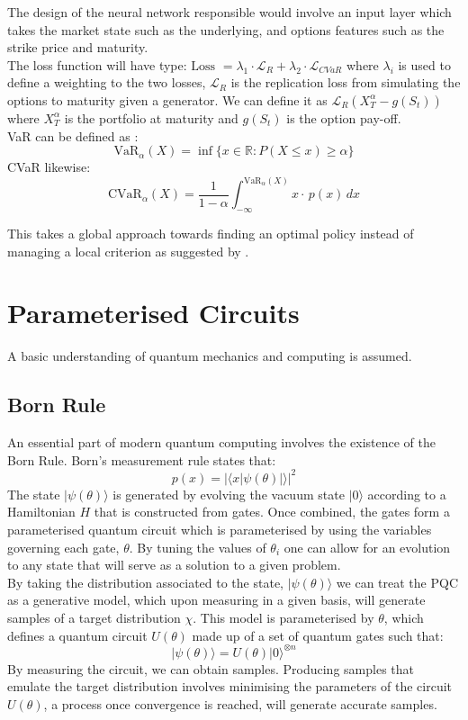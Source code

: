 \documentclass[12pt]{article}
\numberwithin{equation}{section}
\begin{document}
The design of the neural network responsible would involve an input layer which
takes the market state such as the underlying, and options features such as the 
strike price and maturity.\\
The loss function will have
type: $\text{Loss }=\lambda_1\cdot\mathcal{L}_R + \lambda_2 \cdot \mathcal{L}_{CVaR}$
where $\lambda_i$ is used to define a weighting to the two losses, $\mathcal{L}_R$ 
is the replication loss from simulating the options to maturity given a generator. 
We can define it as $\mathcal{L}_R(X^\alpha_T-g(S_t))$ where $X^\alpha_T$ is the 
portfolio at maturity and $g(S_t)$ is the option pay-off.\\
VaR can be defined as :
\begin{equation}
\text{VaR}_{\alpha}(X) = \inf \{x \in \mathbb{R} : P(X \leq x) \geq \alpha \}
\end{equation}
CVaR likewise: 
\begin{equation}
\text{CVaR}_{\alpha}(X) = \frac{1}{1 - \alpha} \int_{-\infty}^{\text{VaR}_{\alpha}(X)} x \cdot\, p(x) \, dx
\end{equation}

This takes a global approach towards finding an optimal policy instead of 
managing a local criterion as suggested by \cite{Fecamp}.


\clearpage 
\section{Parameterised Circuits}
A basic understanding of quantum mechanics and computing is assumed. 
\subsection{Born Rule}
An essential part of modern quantum computing involves the existence of the Born
Rule. Born's measurement rule states that:
\begin{equation}
p(x) = |\langle x|\psi(\theta)|\rangle|^2
\end{equation}
The state $|\psi(\theta)\rangle$ is generated by evolving the vacuum state $|0\rangle$
according to a Hamiltonian $H$ that is constructed from gates. Once combined, the 
gates form a parameterised quantum circuit which is parameterised by using the 
variables governing each gate, $\theta$. By tuning the values of $\theta_i$ one 
can allow for an evolution to any state that will serve as a solution to a given 
problem. \\ 
By taking the distribution associated to the state, $|\psi(\theta)\rangle$ we can 
treat the PQC as a generative model, which upon measuring in a given basis, will 
generate samples of a target distribution $\chi$. This model is parameterised 
by $\theta$, which defines a quantum circuit $U(\theta)$ made up of a set of quantum 
gates such that:
\begin{equation}
|\psi(\theta)\rangle = U(\theta)|0\rangle^{\otimes n}
\end{equation}
By measuring the circuit, we can obtain samples. Producing samples that emulate 
the target distribution involves minimising the parameters of the circuit $U(\theta)$, 
a process once convergence is reached, will generate accurate samples. 
\cite{bornmachine}
\end{document}
